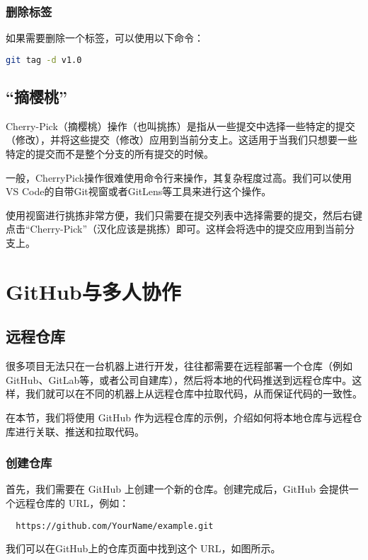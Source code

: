 \subsubsection{删除标签}
如果需要删除一个标签，可以使用以下命令：
\begin{lstlisting}[language=bash]
git tag -d v1.0
\end{lstlisting}

\subsection{“摘樱桃”}

Cherry-Pick（摘樱桃）操作（也叫挑拣）是指从一些提交中选择一些特定的提交（修改），并将这些提交（修改）应用到当前分支上。这适用于当我们只想要一些特定的提交而不是整个分支的所有提交的时候。

一般，CherryPick操作很难使用命令行来操作，其复杂程度过高。我们可以使用VS Code的自带Git视窗或者GitLens等工具来进行这个操作。

使用视窗进行挑拣非常方便，我们只需要在提交列表中选择需要的提交，然后右键点击“Cherry-Pick”（汉化应该是挑拣）即可。这样会将选中的提交应用到当前分支上。

\section{GitHub与多人协作}

\subsection{远程仓库}

很多项目无法只在一台机器上进行开发，往往都需要在远程部署一个仓库（例如GitHub、GitLab等，或者公司自建库），然后将本地的代码推送到远程仓库中。这样，我们就可以在不同的机器上从远程仓库中拉取代码，从而保证代码的一致性。

在本节，我们将使用 GitHub 作为远程仓库的示例，介绍如何将本地仓库与远程仓库进行关联、推送和拉取代码。

\subsubsection{创建仓库}
首先，我们需要在 GitHub 上创建一个新的仓库。创建完成后，GitHub 会提供一个远程仓库的 URL，例如：
\begin{lstlisting}
  https://github.com/YourName/example.git
\end{lstlisting}
我们可以在GitHub上的仓库页面中找到这个 URL，如图所示。

